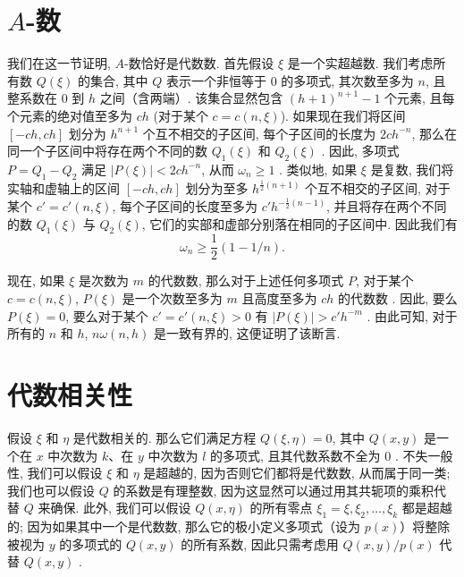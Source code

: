 \section{$A$-数}\label{sec:ch8_2}

我们在这一节证明, $A$-数恰好是代数数. 首先假设 $\xi$ 是一个实超越数. 我们考虑所有数 $Q(\xi)$ 的集合, 其中 $Q$ 表示一个非恒等于 0 的多项式, 其次数至多为 $n$, 且整系数在 0 到 $h$ 之间（含两端）. 该集合显然包含 $(h+1)^{n+1}-1$ 个元素, 且每个元素的绝对值至多为 $ch$ (对于某个 $c = c(n, \xi)$). 如果现在我们将区间 $[-ch, ch]$ 划分为 $h^{n+1}$ 个互不相交的子区间, 每个子区间的长度为 $2ch^{-n}$, 那么在同一个子区间中将存在两个不同的数 $Q_1(\xi)$ 和 $Q_2(\xi)$ . 因此, 多项式 $P = Q_1 - Q_2$ 满足 $|P(\xi)| < 2ch^{-n}$, 从而 $\omega_n \ge 1$ . 类似地, 如果 $\xi$ 是复数, 我们将实轴和虚轴上的区间 $[-ch, ch]$ 划分为至多 $h^{\frac{1}{2}(n+1)}$ 个互不相交的子区间, 对于某个 $c' = c'(n, \xi)$, 每个子区间的长度至多为 $c'h^{-\frac{1}{2}(n-1)}$, 并且将存在两个不同的数 $Q_1(\xi)$ 与 $Q_2(\xi)$, 它们的实部和虚部分别落在相同的子区间中. 因此我们有
\[\omega_n \geqslant \frac{1}{2}(1-1/n).\]

现在, 如果 $\xi$ 是次数为 $m$ 的代数数, 那么对于上述任何多项式 $P$, 对于某个 $c = c(n, \xi)$, $P(\xi)$ 是一个次数至多为 $m$ 且高度至多为 $ch$ 的代数数 . 因此, 要么 $P(\xi) = 0$, 要么对于某个 $c' = c'(n, \xi) > 0$ 有 $|P(\xi)| > c'h^{-m}$ . 由此可知, 对于所有的 $n$ 和 $h$, $n\omega(n, h)$ 是一致有界的, 这便证明了该断言.

\section{代数相关性}\label{sec:ch8_3}

假设 $\xi$ 和 $\eta$ 是代数相关的. 那么它们满足方程 $Q(\xi,\eta)=0$, 其中 $Q(x,y)$ 是一个在 $x$ 中次数为 $k$、在 $y$ 中次数为 $l$ 的多项式, 且其代数系数不全为 0 . 不失一般性, 我们可以假设 $\xi$ 和 $\eta$ 是超越的, 因为否则它们都将是代数数, 从而属于同一类; 我们也可以假设 $Q$ 的系数是有理整数, 因为这显然可以通过用其共轭项的乘积代替 $Q$ 来确保. 此外, 我们可以假设 $Q(x, \eta)$ 的所有零点 $\xi_1 = \xi, \xi_2, \ldots, \xi_k$ 都是超越的; 因为如果其中一个是代数数, 那么它的极小定义多项式（设为 $p(x)$）将整除被视为 $y$ 的多项式的 $Q(x,y)$ 的所有系数, 因此只需考虑用 $Q(x,y)/p(x)$ 代替 $Q(x,y)$ .

